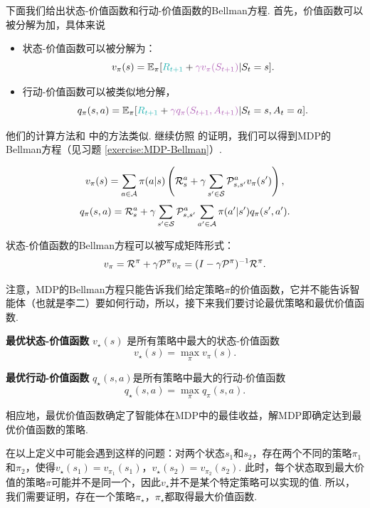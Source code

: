 下面我们给出状态-价值函数和行动-价值函数的Bellman方程. 首先，价值函数可以被分解为加，具体来说
\begin{itemize}
    \item 状态-价值函数可以被分解为：
    \[v_\pi(s) = \E_\pi[\contrastlight{R_{t+1}} + \light{\gamma v_\pi(S_{t+1})}|S_t=s].\]
    \item 行动-价值函数可以被类似地分解，
\[q_\pi(s,a) = \E_\pi[\contrastlight{R_{t+1}} + \light{\gamma q_\pi(S_{t+1},A_{t+1})}|S_t=s,A_t=a].\]
\end{itemize}

他们的计算方法和 中的方法类似. 继续仿照 的证明，我们可以得到MDP的Bellman方程（见习题 \ref{exercise:MDP-Bellman}）.

\begin{theorem}[Bellman方程]\label{theorem:MDP-Bellman}
\[v_\pi(s) = \sum_{a\in \mathcal A}\pi(a|s)\left(\mathcal R_s^a + \gamma \sum_{s'\in \mathcal S}\mathcal P_{s,s'}^av_\pi(s')\right),\]
\[q_\pi(s,a) = \mathcal R_s^a + \gamma \sum_{s'\in \mathcal S}\mathcal P_{s,s'}^a \sum_{a'\in \mathcal A}\pi(a'|s')q_\pi(s',a').\]
\end{theorem}

状态-价值函数的Bellman方程可以被写成矩阵形式：
\[v_\pi = \mathcal R^\pi + \gamma \mathcal P^\pi v_\pi = (I-\gamma \mathcal P^\pi)^{-1}\mathcal R^\pi.\]

注意，MDP的Bellman方程只能告诉我们给定策略$\pi$的价值函数，它并不能告诉智能体（也就是李二）要如何行动，所以，接下来我们要讨论最优策略和最优价值函数. 

\begin{definition}[最优价值函数]
\textbf{最优状态-价值函数} $v_\star(s)$ 是所有策略中最大的状态-价值函数
    \[v_\star(s) = \max_\pi v_\pi(s).\]

\textbf{最优行动-价值函数} $q_\star(s,a)$是所有策略中最大的行动-价值函数
    \[q_\star(s,a) = \max_\pi q_\pi(s,a).\]
\end{definition}

相应地，最优价值函数确定了智能体在MDP中的最佳收益，解MDP即确定达到最优价值函数的策略. 

在以上定义中可能会遇到这样的问题：对两个状态$s_1$和$s_2$，存在两个不同的策略$\pi_1$和$\pi_2$，使得$v_\star(s_1)=v_{\pi_1}(s_1)$，$v_\star(s_2)=v_{\pi_2}(s_2)$. 此时，每个状态取到最大价值的策略$\pi$可能并不是同一个，因此$v_\star$并不是某个特定策略可以实现的值. 所以，我们需要证明，存在一个策略$\pi_\star$，$\pi_\star$都取得最大价值函数. 

